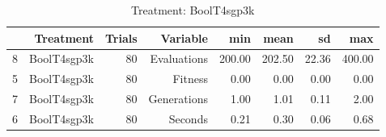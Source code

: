 \begin{table}[ht]
\centering
\begin{tabular}{rrrrrrrr}
  \hline
 & Treatment & Trials & Variable & min & mean & sd & max \\ 
  \hline
8 & BoolT4sgp3k &  80 & Evaluations & 200.00 & 202.50 & 22.36 & 400.00 \\ 
  5 & BoolT4sgp3k &  80 & Fitness & 0.00 & 0.00 & 0.00 & 0.00 \\ 
  7 & BoolT4sgp3k &  80 & Generations & 1.00 & 1.01 & 0.11 & 2.00 \\ 
  6 & BoolT4sgp3k &  80 & Seconds & 0.21 & 0.30 & 0.06 & 0.68 \\ 
   \hline
\end{tabular}
\caption{Treatment: BoolT4sgp3k} 
\end{table}
